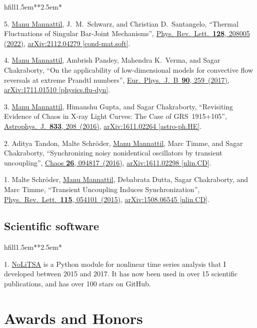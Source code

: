\documentclass[10pt,article,oneside]{memoir}
\def\bname{\underline{Manu Mannattil}}    %
\def\doi#1#2{\href{https://dx.doi.org/#1}{#2}}
\def\arxiv#1#2{\href{https://arxiv.org/abs/#1}{arXiv:#1 [#2]}}
\begin{document}
\begin{flexlabelled}{hfill}{1.5em}{*}{*}{2.5em}{*}
  \setlength{\itemsep}{-0.25em}
  \item[5.] \bname, J.~M.~Schwarz, and Christian D.~Santangelo, ``Thermal Fluctuations of Singular Bar-Joint Mechanisms'', \doi{10.1103/PhysRevLett.128.208005}{Phys.~Rev.~Lett.~\textbf{128}, 208005 (2022)}, \arxiv{2112.04279}{cond-mat.soft}.
  \item[4.] \bname, Ambrish Pandey, Mahendra K.~Verma, and Sagar Chakraborty, ``On the applicability of low-dimensional models for convective flow reversals at extreme Prandtl numbers'', \doi{10.1140/epjb/e2017-80391-1}{Eur.~Phys.~J.~B~\textbf{90}, 259~(2017)}, \arxiv{1711.01510}{physics.flu-dyn}.
  \item[3.] \bname, Himanshu Gupta, and Sagar Chakraborty, ``Revisiting Evidence of Chaos in X-ray Light Curves: The Case of GRS~1915+105'', \doi{10.3847/1538-4357/833/2/208}{Astrophys.~J.~\textbf{833}, 208~(2016)}, \arxiv{1611.02264}{astro-ph.HE}.
  \item[2.] Aditya Tandon, Malte Schr\"{o}der, \bname, Marc Timme, and Sagar Chakraborty, ``Synchronizing noisy nonidentical oscillators by transient uncoupling'', \doi{10.1063/1.4959141}{Chaos \textbf{26}, 094817~(2016)}, \arxiv{1611.02298}{nlin.CD}.
  \item[1.] Malte Schr\"{o}der, \bname, Debabrata Dutta, Sagar Chakraborty, and Marc Timme, ``Transient Uncoupling Induces Synchronization'', \doi{10.1103/PhysRevLett.115.054101}{Phys.~Rev.~Lett.~\textbf{115}, 054101~(2015)}, \arxiv{1508.06545}{nlin.CD}.
\end{flexlabelled}

\subsection{Scientific software}

\begin{flexlabelled}{hfill}{1.5em}{*}{*}{2.5em}{*}
  \setlength{\itemsep}{-0.25em}
  \item[1.] \href{https://github.com/manu-mannattil/NoLiTSA}{NoLiTSA} is a Python module for nonlinear time series analysis that I developed between 2015 and 2017.  It has now been used in over 15 scientific publications, and has over 100 stars on GitHub.
\end{flexlabelled}


\section{Awards and Honors}
\end{document}
